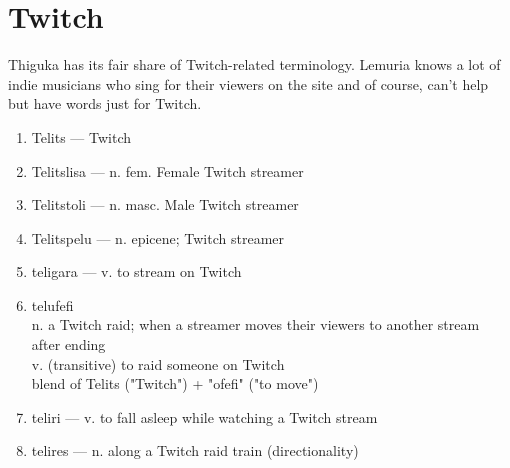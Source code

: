 \section{Twitch}
Thiguka has its fair share of Twitch-related terminology.
Lemuria knows a lot of indie musicians who sing for their viewers on the site and of course, can't help but have words just for Twitch.

\begin{enumerate}
\item Telits --- Twitch
\item Telitslisa --- n. fem. Female Twitch streamer
\item Telitstoli --- n. masc. Male Twitch streamer
\item Telitspelu --- n. epicene; Twitch streamer
\item teligara --- v. to stream on Twitch
\item telufefi \\ 
n. a Twitch raid; when a streamer moves their viewers to another stream after ending \\
v. (transitive) to raid someone on Twitch\\
blend of Telits ("Twitch") + "ofefi" ("to move")
\item teliri --- v. to fall asleep while watching a Twitch stream
\item telires --- n. along a Twitch raid train (directionality)
\end{enumerate}

